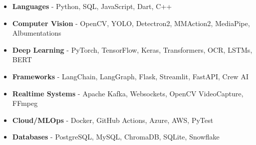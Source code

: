 \smallskip
\begin{itemize}
\item \textbf{Languages} - Python, SQL, JavaScript, Dart, C++
\item \textbf{Computer Vision} - OpenCV, YOLO, Detectron2, MMAction2, MediaPipe, Albumentations
\item \textbf{Deep Learning} - PyTorch, TensorFlow, Keras, Transformers, OCR, LSTMs, BERT
\item \textbf{Frameworks} - LangChain, LangGraph, Flask, Streamlit, FastAPI, Crew AI
\item \textbf{Realtime Systems} - Apache Kafka, Websockets, OpenCV VideoCapture, FFmpeg
\item \textbf{Cloud/MLOps} - Docker, GitHub Actions, Azure, AWS, PyTest
\item \textbf{Databases} - PostgreSQL, MySQL, ChromaDB, SQLite, Snowflake
\end{itemize}